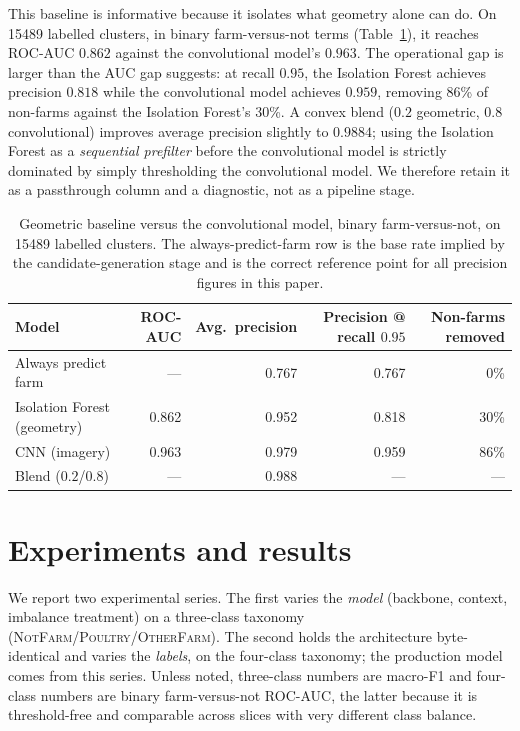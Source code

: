 \documentclass[11pt,a4paper]{article}
\begin{document}
This baseline is informative because it isolates what geometry alone can do. On
\num{15489} labelled clusters, in binary farm-versus-not terms
(Table~\ref{tab:ifcnn}), it reaches ROC-AUC $0.862$ against the convolutional
model's $0.963$. The operational gap is larger than the AUC gap suggests: at
recall $0.95$, the Isolation Forest achieves precision $0.818$ while the
convolutional model achieves $0.959$, removing 86\% of non-farms against the
Isolation Forest's 30\%. A convex blend ($0.2$ geometric, $0.8$ convolutional)
improves average precision slightly to $0.9884$; using the Isolation Forest as a
\emph{sequential prefilter} before the convolutional model is strictly dominated
by simply thresholding the convolutional model. We therefore retain it as a
passthrough column and a diagnostic, not as a pipeline stage.

\begin{table}[t]
\centering
\small
\caption{Geometric baseline versus the convolutional model, binary
farm-versus-not, on \num{15489} labelled clusters. The always-predict-farm row
is the base rate implied by the candidate-generation stage and is the correct
reference point for all precision figures in this paper.}
\label{tab:ifcnn}
\begin{tabular}{lrrrr}
\toprule
Model & ROC-AUC & Avg.\ precision & Precision @ recall $0.95$ & Non-farms removed \\
\midrule
Always predict farm      & ---    & 0.767  & 0.767 & 0\% \\
Isolation Forest (geometry) & 0.862 & 0.952 & 0.818 & 30\% \\
CNN (imagery)            & 0.963  & 0.979  & 0.959 & 86\% \\
Blend ($0.2$/$0.8$)      & ---    & 0.988  & ---   & --- \\
\bottomrule
\end{tabular}
\end{table}

\section{Experiments and results}
\label{sec:results}

We report two experimental series. The first varies the \emph{model} (backbone,
context, imbalance treatment) on a three-class taxonomy
(\textsc{NotFarm}/\textsc{Poultry}/\textsc{OtherFarm}). The second holds the
architecture byte-identical and varies the \emph{labels}, on the four-class
taxonomy; the production model comes from this series. Unless noted, three-class
numbers are macro-F1 and four-class numbers are binary farm-versus-not ROC-AUC,
the latter because it is threshold-free and comparable across slices with very
different class balance.
\end{document}
